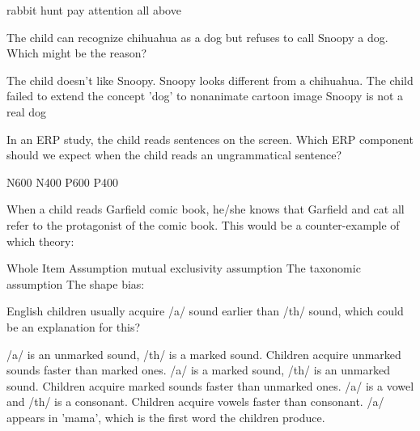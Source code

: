\documentclass[legalpaper, 12pt, addpoints, answers]{exam}
\begin{document}
\begin{questions}
 \begin{choices}
            \choice rabbit
            \choice hunt
            \choice pay attention
            \choice all above
\end{choices}
        \vspace{0.15in}
         
            \question The child can recognize chihuahua as a dog but refuses to call Snoopy a dog. Which might be the reason?
        \begin{choices}
            \choice The child doesn't like Snoopy.
            \choice Snoopy looks different from a chihuahua.
            \choice The child failed to extend the concept 'dog' to nonanimate cartoon image
            \choice Snoopy is not a real dog
        \end{choices}
        \vspace{0.15in}

\question In an ERP study, the child reads sentences on the screen. Which ERP component should we expect when the child reads an ungrammatical sentence?

    \begin{oneparchoices}
         \choice N600
         \choice N400
         \choice P600
         \choice P400
    \end{oneparchoices}
\vspace{0.2in}

\question When a child reads Garfield comic book, he/she knows that Garfield and cat all refer to the protagonist of the comic book. This would be a counter-example of which theory:


        \begin{choices}
            \choice Whole Item Assumption
            \choice mutual exclusivity assumption
            \choice The taxonomic assumption
            \choice The shape bias:
        \end{choices}
  \vspace{0.15in}

 \question English children usually acquire /a/ sound earlier than /th/ sound, which could be an explanation for this?
 
        \begin{choices}
            \choice /a/ is an unmarked sound, /th/ is a marked sound. Children acquire unmarked sounds faster than marked ones.
            \choice /a/ is a marked sound, /th/ is an unmarked sound. Children acquire marked sounds faster than unmarked ones.
            \choice /a/ is a vowel and /th/ is a consonant. Children acquire vowels faster than consonant.
            \choice /a/ appears in 'mama', which is the first word the children produce. 
        \end{choices}
\vspace{0.15in}


\end{questions}
\end{document}
